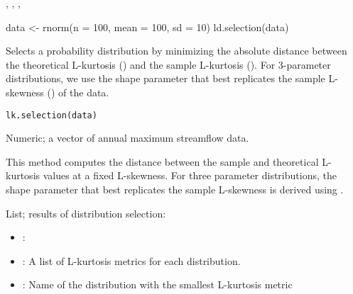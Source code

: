 \documentclass[a4paper]{book}
\begin{document}
%
\begin{SeeAlso}
, , , 
\end{SeeAlso}
%
\begin{Examples}
\begin{ExampleCode}
data <- rnorm(n = 100, mean = 100, sd = 10)
ld.selection(data)

\end{ExampleCode}
\end{Examples}
%
\begin{Description}
Selects a probability distribution by minimizing the absolute distance
between the theoretical L-kurtosis () and the sample L-kurtosis
(). For 3-parameter distributions, we use the shape parameter that
best replicates the sample L-skewness () of the data.
\end{Description}
%
\begin{Usage}
\begin{verbatim}
lk.selection(data)
\end{verbatim}
\end{Usage}
%
\begin{Arguments}
\begin{ldescription}
\item[\code{data}] Numeric; a vector of annual maximum streamflow data.
\end{ldescription}
\end{Arguments}
%
\begin{Details}
This method computes the distance between the sample and theoretical L-kurtosis values at
a fixed L-skewness. For three parameter distributions, the shape parameter that best
replicates the sample L-skewness is derived using .
\end{Details}
%
\begin{Value}
List; results of distribution selection:
\begin{itemize}

\item{} : 
\item{} : A list of L-kurtosis metrics for each distribution.
\item{} : Name of the distribution with the smallest L-kurtosis metric

\end{itemize}

\end{Value}
\end{document}
